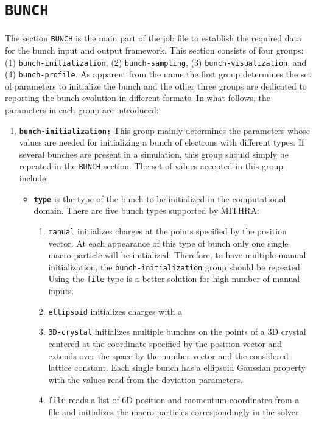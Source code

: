 \section{\texttt{BUNCH}}

The section \texttt{BUNCH} is the main part of the job file to establish the required data for the bunch input and output framework.
%
This section consists of four groups: (1) \texttt{bunch-initialization}, (2) \texttt{bunch-sampling}, (3) \texttt{bunch-visualization}, and (4) \texttt{bunch-profile}.
%
As apparent from the name the first group determines the set of parameters to initialize the bunch and the other three groups are dedicated to reporting the bunch evolution in different formats.
%
In what follows, the parameters in each group are introduced:

\begin{enumerate}
\item \textbf{\texttt{bunch-initialization:}} This group mainly determines the parameters whose values are needed for initializing a bunch of electrons with different types. If several bunches are present in a simulation, this group should simply be repeated in the \texttt{BUNCH} section. The set of values accepted in this group include:
\begin{itemize}
\item \textbf{\texttt{type}} is the type of the bunch to be initialized in the computational domain. There are five bunch types supported by MITHRA:
\begin{enumerate}
	\item \texttt{manual} initializes charges at the points specified by the position vector. At each appearance of this type of bunch only one single macro-particle will be initialized. Therefore, to have multiple manual initialization, the \texttt{bunch-initialization} group should be repeated. Using the \texttt{file} type is a better solution for high number of manual inputs.
	\item \texttt{ellipsoid} initializes charges with a
	\item \texttt{3D-crystal} initializes multiple bunches on the points of a 3D crystal centered at the coordinate specified by the position vector and extends over the space by the number vector and the considered lattice constant. Each single bunch has a ellipsoid Gaussian property with the values read from the deviation parameters.
	\item \texttt{file} reads a list of 6D position and momentum coordinates from a file and initializes the macro-particles correspondingly in the solver.

\end{enumerate}
\end{itemize}
\end{enumerate}
